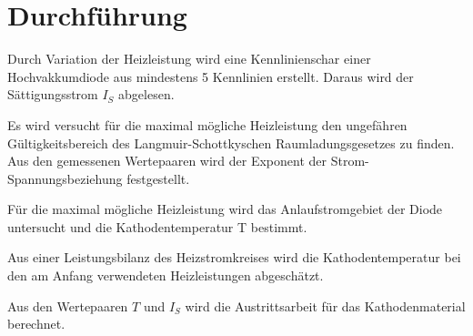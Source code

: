 \section{Durchführung}
\label{sec:Durchführung}

Durch Variation der Heizleistung wird eine Kennlinienschar 
einer Hochvakkumdiode aus mindestens 5 Kennlinien erstellt. 
Daraus wird der Sättigungsstrom $I_S$ abgelesen. 

Es wird versucht für die maximal mögliche Heizleistung den 
ungefähren Gültigkeitsbereich des Langmuir-Schottkyschen 
Raumladungsgesetzes zu finden. 
Aus den gemessenen Wertepaaren wird der Exponent der Strom-
Spannungsbeziehung festgestellt. 

Für die maximal mögliche Heizleistung wird das 
Anlaufstromgebiet der Diode untersucht und die 
Kathodentemperatur T bestimmt. 

Aus einer Leistungsbilanz des Heizstromkreises wird die 
Kathodentemperatur bei den am Anfang verwendeten 
Heizleistungen abgeschätzt. 

Aus den Wertepaaren $T$ und $I_S$ wird die Austrittsarbeit für 
das Kathodenmaterial berechnet. 
